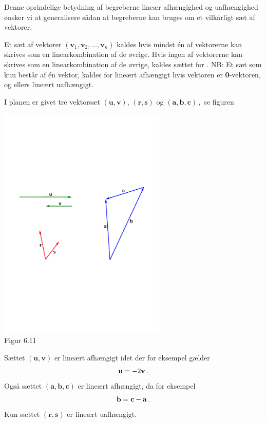 Denne oprindelige betydning af begreberne lineær afhængighed og uafhængighed ønsker vi at generalisere sådan at begreberne kan bruges om et vilkårligt sæt  af vektorer. 

\begin{definition}\label{defLinAfh}
Et sæt af vektorer $(\mathbf v_1,\mathbf v_2,\ldots,\mathbf v_n)$ kaldes  hvis mindst én af vektorerne kan skrives som en linearkombination af de øvrige.\bs
Hvis ingen af vektorerne kan skrives som en linearkombination af de øvrige, kaldes sættet for .\bs
NB: Et sæt som kun består af én vektor, kaldes for lineært afhængigt hvis vektoren er \textbf{0}-vektoren, og ellers lineært uafhængigt.
\end{definition}


\begin{example}
I planen er givet tre vektorsæt $(\mathbf u,\mathbf v)$, $(\mathbf r,\mathbf s)$ og $(\mathbf a,\mathbf b,\mathbf c)\,,$ se figuren
\begin{center}
		\includegraphics[trim=1.5cm 10cm 1.5cm 10cm,width=0.6\textwidth,clip]{geometer/vektor13.pdf}		
		\\Figur 6.11
\end{center}
Sættet $(\mathbf u,\mathbf v)$ er lineært afhængigt idet der for eksempel gælder $$\mathbf u =-2\mathbf{v}\,.$$ Også sættet $(\mathbf a,\mathbf b,\mathbf c)$ er lineært afhængigt, da for eksempel $$\mathbf{b}=\mathbf{c}-\mathbf{a}\,.$$
Kun sættet $(\mathbf r,\mathbf s)$ er lineært uafhængigt.
\end{example}

